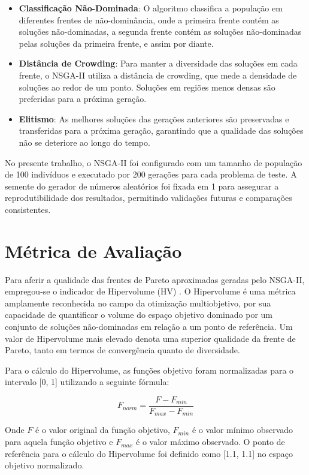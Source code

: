 \documentclass[12pt,openright,oneside,a4paper,english,brazil]{abntex2}
\begin{document}
\begin{itemize}
    \item \textbf{Classificação Não-Dominada}: O algoritmo classifica a população em diferentes frentes de não-dominância, onde a primeira frente contém as soluções não-dominadas, a segunda frente contém as soluções não-dominadas pelas soluções da primeira frente, e assim por diante.
    \item \textbf{Distância de Crowding}: Para manter a diversidade das soluções em cada frente, o NSGA-II utiliza a distância de crowding, que mede a densidade de soluções ao redor de um ponto. Soluções em regiões menos densas são preferidas para a próxima geração.
    \item \textbf{Elitismo}: As melhores soluções das gerações anteriores são preservadas e transferidas para a próxima geração, garantindo que a qualidade das soluções não se deteriore ao longo do tempo.
\end{itemize}

No presente trabalho, o NSGA-II foi configurado com um tamanho de população de 100 indivíduos e executado por 200 gerações para cada problema de teste. A semente do gerador de números aleatórios foi fixada em 1 para assegurar a reprodutibilidade dos resultados, permitindo validações futuras e comparações consistentes.

\section{Métrica de Avaliação}
Para aferir a qualidade das frentes de Pareto aproximadas geradas pelo NSGA-II, empregou-se o indicador de Hipervolume (HV) \cite{cao2015using}. O Hipervolume é uma métrica amplamente reconhecida no campo da otimização multiobjetivo, por sua capacidade de quantificar o volume do espaço objetivo dominado por um conjunto de soluções não-dominadas em relação a um ponto de referência. Um valor de Hipervolume mais elevado denota uma superior qualidade da frente de Pareto, tanto em termos de convergência quanto de diversidade.

Para o cálculo do Hipervolume, as funções objetivo foram normalizadas para o intervalo [0, 1] utilizando a seguinte fórmula:

$$F_{norm} = \frac{F - F_{min}}{F_{max} - F_{min}}$$

Onde $F$ é o valor original da função objetivo, $F_{min}$ é o valor mínimo observado para aquela função objetivo e $F_{max}$ é o valor máximo observado. O ponto de referência para o cálculo do Hipervolume foi definido como [1.1, 1.1] no espaço objetivo normalizado.
\end{document}
